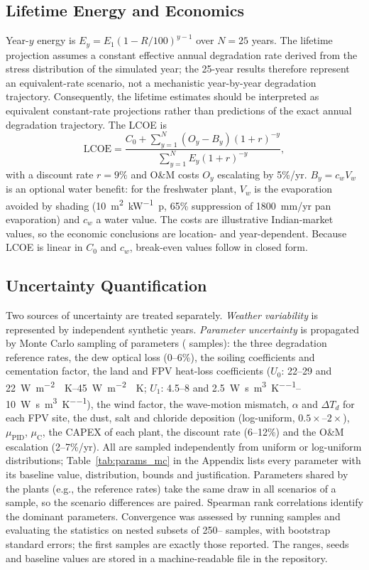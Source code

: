 \documentclass[journal]{IEEEtran}
\begin{document}
\subsection{Lifetime Energy and Economics}
Year-$y$ energy is $E_y = E_1(1-R/100)^{y-1}$ over $N=25$ years. The lifetime projection assumes a constant effective
annual degradation rate derived from the stress distribution of the simulated year; the 25-year results therefore
represent an equivalent-rate scenario, not a mechanistic year-by-year degradation trajectory. Consequently, the
lifetime estimates should be interpreted as equivalent constant-rate projections rather than predictions of the exact
annual degradation trajectory. The LCOE is
\begin{equation}
\mathrm{LCOE} = \frac{C_0 + \sum_{y=1}^{N} (O_y - B_y)(1+r)^{-y}}{\sum_{y=1}^{N}E_y(1+r)^{-y}},
\label{eq:lcoe}
\end{equation}
with a discount rate $r=9\%$ and O\&M costs $O_y$ escalating by 5\%/yr. $B_y = c_w V_w$ is an optional water benefit:
for the freshwater plant, $V_w$ is the evaporation avoided by shading (\SI{10}{\square\metre\per\kilo\watt p}, 65\%
suppression of \SI{1800}{mm/yr} pan evaporation) and $c_w$ a water value. The costs are illustrative Indian-market
values, so the economic conclusions are location- and year-dependent. Because LCOE is linear in $C_0$ and $c_w$,
break-even values follow in closed form.

\subsection{Uncertainty Quantification}\label{sec:uq}
Two sources of uncertainty are treated separately. \emph{Weather variability} is represented by \NSeeds{} independent
synthetic years. \emph{Parameter uncertainty} is propagated by Monte Carlo sampling of \NParams{} parameters
(\NMC{} samples): the three degradation reference rates, the dew optical loss (0--6\%), the soiling coefficients and
cementation factor, the land and FPV heat-loss coefficients ($U_0$: 22--29 and \SIrange{22}{45}{\watt\per\square\metre
\per\kelvin}; $U_1$: 4.5--8 and \SIrange{2.5}{10}{\watt\second\per\cubic\metre\per\kelvin}), the wind factor, the
wave-motion mismatch, $\alpha$ and $\Delta T_d$ for each FPV site, the dust, salt and chloride deposition
(log-uniform, $0.5\times$--$2\times$), $\mu_{\mathrm{PID}}$, $\mu_{\mathrm{C}}$, the CAPEX of each plant, the discount
rate (6--12\%) and the O\&M escalation (2--7\%/yr). All are sampled independently from uniform or log-uniform
distributions; Table~\ref{tab:params_mc} in the Appendix lists every parameter with its baseline value, distribution,
bounds and justification. Parameters
shared by the plants (e.g., the reference rates) take the same draw in all scenarios of a sample, so the scenario
differences are paired. Spearman rank correlations identify the dominant parameters. Convergence was assessed by
running \NMCConv{} samples and evaluating the statistics on nested subsets of 250--\NMCConv{} samples, with bootstrap
standard errors; the first \NMC{} samples are exactly those reported. The ranges, seeds and baseline values are stored
in a machine-readable file in the repository.
\end{document}
